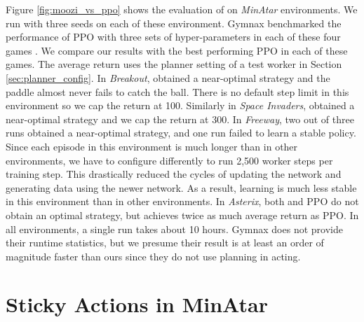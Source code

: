 \FloatBarrier

Figure \ref{fig:moozi_vs_ppo} shows the evaluation of \moozi on \textit{MinAtar} environments.
We run \moozi with three seeds on each of these environment.
Gymnax benchmarked the performance of PPO with three sets of hyper-parameters in each of these four games \cite{GymnaxJAXbasedReinforcement_RobertTjarkoLange_2022,ProximalPolicyOptimization_Schulman.Wolski.ea_2017}.
We compare our results with the best performing PPO in each of these games.
The average return uses the planner setting of a test worker in Section \ref{sec:planner_config}.
In \textit{Breakout}, \moozi obtained a near-optimal strategy and the paddle almost never fails to catch the ball.
There is no default step limit in this environment so we cap the return at 100.
Similarly in \textit{Space Invaders}, \moozi obtained a near-optimal strategy and we cap the return at 300.
In \textit{Freeway}, two out of three runs  obtained a near-optimal strategy, and one run failed to learn a stable policy.
Since each episode in this environment is much longer than in other environments, we have to configure \moozi differently to run 2,500 worker steps per training step.
This drastically reduced the cycles of updating the network and generating data using the newer network.
As a result, \moozi learning is much less stable in this environment than in other environments.
In \textit{Asterix}, both \moozi and PPO do not obtain an optimal strategy, but \moozi achieves twice as much average return as PPO.
In all environments, a single run takes about 10 hours.
Gymnax does not provide their runtime statistics, but we presume their result is at least an order of magnitude faster than ours since they do not use planning in acting.


\FloatBarrier


\section{Sticky Actions in MinAtar} \label{sec:sticky_minatar}

